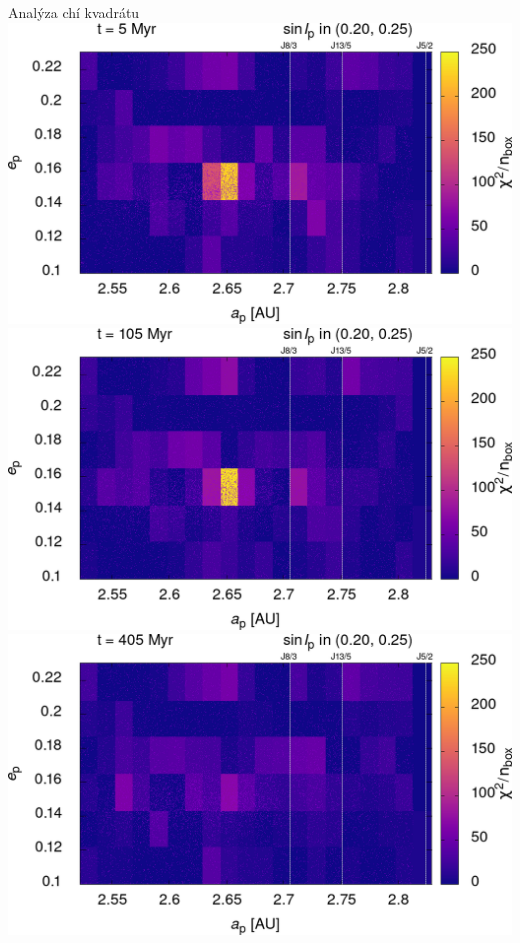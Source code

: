 \documentclass[xcolor=dvipsnames]{beamer}
\begin{document}
\begin{frame}[t]{\secname}{Analýza chí kvadrátu}
\centering
\includegraphics[width=0.41\paperwidth]{../obr/ae_chi_0006t.png}
\includegraphics[width=0.41\paperwidth]{../obr/ae_chi_0106t.png}\\
\includegraphics[width=0.41\paperwidth]{../obr/ae_chi_0406t.png}

\end{frame}
\end{document}
